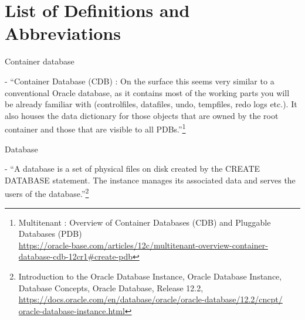 

\newpage
\setcounter{secnumdepth}{0}
\section{List of Definitions and Abbreviations}

\noindent\begin{itemize*}

\item{\begin{bf}Container database\end{bf}} - ``Container Database (CDB) : On 
the surface this seems very similar to a conventional Oracle database, as it 
contains most of the working parts you will be already familiar with 
(controlfiles, datafiles, undo, tempfiles, redo logs etc.). It also houses 
the data dictionary for those objects that are owned by the root container 
and those that are visible to all PDBs.''\footnote{Multitenant : Overview of Container Databases (CDB) and Pluggable Databases (PDB)\\
\href{https://oracle-base.com/articles/12c/multitenant-overview-container-database-cdb-12cr1\#create-pdb}{https://oracle-base.com/articles/12c/multitenant-overview-container-database-cdb-12cr1\#create-pdb}}



\item{\begin{bf}Database\end{bf}} - ``A database is a set of physical
  files on disk created by the CREATE DATABASE statement. The instance
  manages its associated data and serves the users of the database.''\footnote{Introduction to the Oracle Database Instance, Oracle Database Instance, Database Concepts, Oracle Database,
    Release 12.2,
    \href{https://docs.oracle.com/en/database/oracle/oracle-database/12.2/cncpt/oracle-database-instance.html}{https://docs.oracle.com/en/database/oracle/oracle-database/12.2/cncpt/}\newline
  \href{http://www.google.com}{oracle-database-instance.html}}



\end{itemize*}
